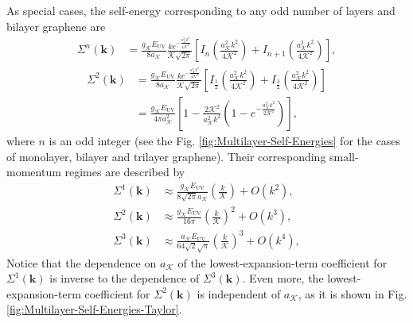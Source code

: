 \documentclass[english,aps,prd,nofootinbib,twocolumn]{revtex4-1}
\begin{document}
As special cases, the self-energy corresponding to any odd number of layers and bilayer graphene are
\begin{equation}
\begin{split}
\!\!\!\!\Sigma^{n}\!(\mathbf{k })
\! &= \!
\frac{g_{\mathcal{K}}E_{\mathrm{UV}}}{8a_{\mathcal{K}}}
\frac{k e^{-\frac{a_{\mathcal{K}}^{2}k^{2}}{4\mathcal{K}^{2}}}}{\mathcal{K}\sqrt{2\pi}}
\!\!
\left[ 
\!
I_{n}\!\!
\left(\!
\frac{a_{\mathcal{K}}^{2}k^{2}}{4\mathcal{K}^{2}}
\!\right)
\!\! + \!
I_{n+1}\!\!
\left(\!
\frac{a_{\mathcal{K}}^{2}k^{2}}{4\mathcal{K}^{2}}
\!\right)
\!
\right]
\!
,
\end{split}
\end{equation}
\begin{equation}
\begin{split}
\Sigma^{2}(\mathbf{k })
\! &= \!
\frac{g_{\mathcal{K}}E_{\mathrm{UV}}}{8a_{\mathcal{K}}}
\frac{k e^{-\frac{a_{\mathcal{K}}^{2}k^{2}}{4\mathcal{K}^{2}}}}{\mathcal{K}\sqrt{2\pi}}
\!\!
\left[ 
I_{\frac{1}{2}}\!\!
\left(\!
\frac{a_{\mathcal{K}}^{2}k^{2}}{4\mathcal{K}^{2}}
\!\right)
\!\! + \!
I_{\frac{3}{2}}\!\!
\left(\!
\frac{a_{\mathcal{K}}^{2}k^{2}}{4\mathcal{K}^{2}}
\!\right)
\!
\right]
\! \\ &= \!
\frac{g_{\mathcal{K}}E_{\mathrm{UV}}}{4\pi a_{\mathcal{K}}^{2}}
\left[
1 - 
\frac{2\mathcal{K}^{2}}{a_{\mathcal{K}}^{2}k^{2}}
\left(
1-e^{-\frac{a_{\mathcal{K}}^{2}k^{2}}{2\mathcal{K}^{2}}}
\right)
\right]
\!
,
\end{split}
\end{equation}
where $n$ is an odd integer (see the Fig. \ref{fig:Multilayer-Self-Energies} for the cases of monolayer, bilayer and trilayer graphene). Their corresponding small-momentum regimes are described by
\begin{equation}
\begin{split}
\Sigma^{1}\!(\mathbf{k })
 &\approx 
\frac{g_{\mathcal{K}}E_{\mathrm{UV}}}
{8 \sqrt{2 \pi } a_{\mathcal{K}}}
\!
\left( \frac{k}{\mathcal{K}} \right)
+ O(k^{2})
, \\
\Sigma^{2}(\mathbf{k })
 &\approx 
\frac{g_{\mathcal{K}}E_{\mathrm{UV}}}
{16\pi }
\!\! 
\left( \frac{k}{\mathcal{K}} \right)^2
\!\!
+ O(k^{3})
, \\
\Sigma^{3}(\mathbf{k })
 &\approx 
\frac{a_{\mathcal{K}} E_{\mathrm{UV}}}
{64 \sqrt{2} \sqrt{\pi }}
\!\! 
\left( \frac{k}{\mathcal{K}} \right)^3
\!\!
+ O(k^{4})
,
\end{split}
\end{equation}
Notice that the dependence on $a_{\mathcal{K}}$ of the lowest-expansion-term coefficient for $\Sigma^{1}(\mathbf{k })$ is inverse to the dependence of $\Sigma^{3}(\mathbf{k })$. Even more, the lowest-expansion-term coefficient for $\Sigma^{2}(\mathbf{k })$ is independent of $a_{\mathcal{K}}$, as it is shown in Fig. \ref{fig:Multilayer-Self-Energies-Taylor}. 
\end{document}
